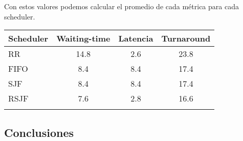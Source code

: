 Con estos valores podemos calcular el promedio de cada métrica para cada scheduler.

\begin{center}
        \begin{tabular}{| l | c | c | c |}
                \hline
    Scheduler & Waiting-time & Latencia & Turnaround \\
                \hline
    RR   &    14.8 &  2.6 & 23.8 \\
    FIFO &     8.4 &  8.4 & 17.4 \\
    SJF  &     8.4 &  8.4 & 17.4 \\
    RSJF &     7.6 &  2.8 & 16.6 \\
                \hline
	\label{tab:tabla7}
        \end{tabular}
\end{center}

\subsection{Conclusiones}

